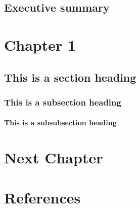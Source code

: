 \documentclass[oneside,12pt]{book}
\begin{document}

\clearpage
\frontmatter
\pagestyle{plain}
\setcounter{page}{1}
\setcounter{tocdepth}{2}
\tableofcontents
\clearpage
\section*{Executive summary}\label{executive-summary}

\mainmatter
\pagestyle{fancy}

\chapter{Chapter 1}\label{chapter-1}

\section{This is a section heading}\label{this-is-a-section-heading}

\subsection{This is a subsection
heading}\label{this-is-a-subsection-heading}

\subsubsection{This is a subsubsection
heading}\label{this-is-a-subsubsection-heading}

\chapter{Next Chapter}\label{next-chapter}

\chapter*{References}\label{references}
\end{document}
